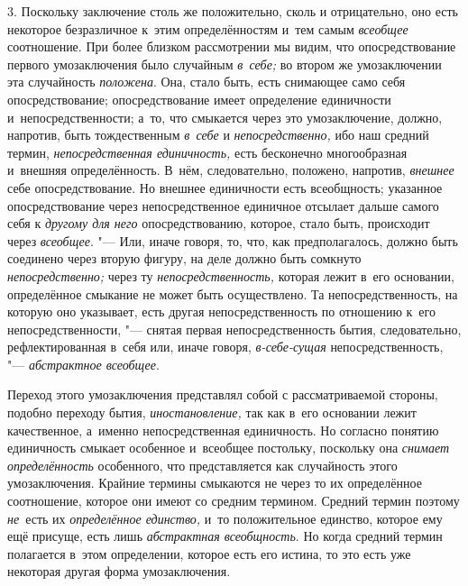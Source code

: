 3. Поскольку заключение столь же положительно, сколь и
отрицательно, оно есть некоторое безразличное к~этим определённостям и~тем
самым {\em всеобщее} соотношение. При более близком рассмотрении мы видим, что
опосредствование первого умозаключения было случайным {\em в~себе;} во втором
же умозаключении эта случайность {\em положена}. Она,
стало быть, есть снимающее само себя опосредствование; опосредствование
имеет определение единичности и~непосредственности; а~то, что смыкается
через это умозаключение, должно, напротив, быть тождественным
{\em в~себе} и {\em непосредственно,} ибо наш средний термин,
{\em непосредственная единичность,}
есть бесконечно многообразная и~внешняя определённость.
В~нём, следовательно, положено, напротив, {\em внешнее} себе
опосредствование. Но внешнее единичности есть всеобщность; указанное
опосредствование через непосредственное единичное отсылает дальше самого
себя к {\em другому для него}
опосредствованию, которое, стало быть, происходит через
{\em всеобщее}. "--- Или,
иначе говоря, то, что, как предполагалось, должно быть соединено через
вторую фигуру, на деле должно быть сомкнуто {\em непосредственно;}
через ту {\em непосредственность,}
которая лежит в~его основании, определённое смыкание не может
быть осуществлено. Та непосредственность, на которую оно указывает, есть
другая непосредственность по отношению к~его непосредственности, "---
снятая первая непосредственность бытия, следовательно,
рефлектированная в~себя или, иначе говоря,
{\em в-себе-сущая}
непосредственность, "---
{\em абстрактное всеобщее}.

Переход этого умозаключения представлял собой с
рассматриваемой стороны, подобно переходу бытия, {\em иностановление,}
так как в~его основании лежит качественное, а~именно
непосредственная единичность. Но согласно понятию единичность смыкает
особенное и~всеобщее постольку, поскольку она
{\em снимает определённость}
особенного, что представляется как случайность этого
умозаключения. Крайние термины смыкаются не через то их определённое
соотношение, которое они имеют со средним термином. Средний термин поэтому
{\em не}~есть их
{\em определённое единство,}
и~то положительное единство, которое ему ещё присуще, есть
лишь {\em абстрактная всеобщность}.
Но когда средний термин полагается в~этом определении,
которое есть его истина, то это есть уже некоторая другая форма
умозаключения.

